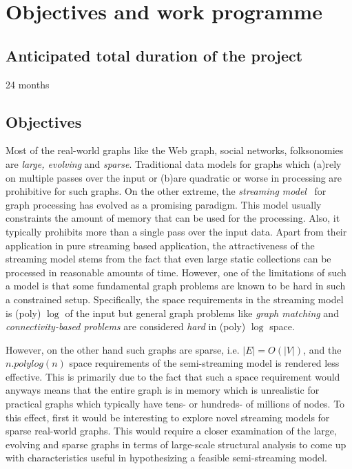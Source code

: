 \newpage

\section{Objectives and work programme}
\label{sec:work-packages}


\subsection{Anticipated total duration of the project}
24 months

\subsection{Objectives}
Most of the real-world graphs like the Web graph, social networks, folksonomies are \emph{large, evolving} and \emph{sparse}. Traditional data models for graphs which (a)rely on multiple passes over the input or (b)are quadratic or worse in processing are prohibitive for such graphs. On the other extreme, the \emph{streaming model}~\cite{Henzinger,Feigenbaum} for graph processing has evolved as a promising paradigm. This model usually constraints the amount of memory that can be used for the processing. Also, it typically prohibits more than a single pass over the input data. Apart from their application in pure streaming based application, the attractiveness of the streaming model stems from the fact that even large static collections can be processed in reasonable amounts of time. However, one of the limitations of such a model is that some fundamental graph problems are known to be hard in such a constrained setup. Specifically, the space requirements in the streaming model is (poly) $\log$ of the input but general graph problems like \emph{graph matching} and \emph{connectivity-based problems} are considered \emph{hard} in (poly) $\log$ space. 


However, on the other hand such graphs are sparse, i.e. $|E| = O (|V|)$, and the $n.polylog(n)$ space requirements of the semi-streaming model is rendered less effective. This is primarily due to the fact that such a space requirement would anyways means that the entire graph is in memory which is unrealistic for practical graphs which typically have tens- or hundreds- of millions of nodes. To this effect, first it would be interesting to explore novel streaming models for sparse real-world graphs. This would require a closer examination of the large, evolving and sparse graphs in terms of large-scale structural analysis to come up with characteristics useful in hypothesizing a feasible semi-streaming model.

